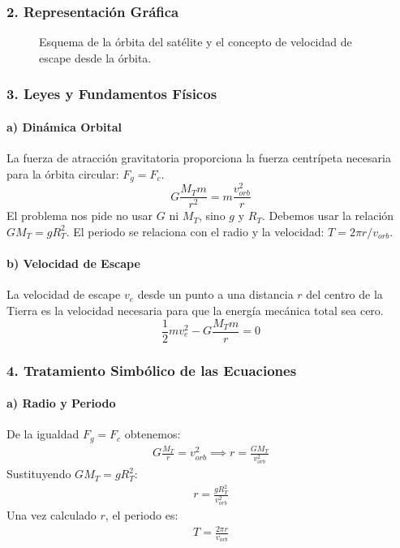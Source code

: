 \subsubsection*{2. Representación Gráfica}
\begin{figure}[H]
    \centering
    \caption{Esquema de la órbita del satélite y el concepto de velocidad de escape desde la órbita.}
\end{figure}

\subsubsection*{3. Leyes y Fundamentos Físicos}
\paragraph*{a) Dinámica Orbital}
La fuerza de atracción gravitatoria proporciona la fuerza centrípeta necesaria para la órbita circular: $F_g = F_c$.
$$ G \frac{M_T m}{r^2} = m \frac{v_{orb}^2}{r} $$
El problema nos pide no usar $G$ ni $M_T$, sino $g$ y $R_T$. Debemos usar la relación $GM_T = g R_T^2$.
El periodo se relaciona con el radio y la velocidad: $T = 2\pi r / v_{orb}$.
\paragraph*{b) Velocidad de Escape}
La velocidad de escape $v_e$ desde un punto a una distancia $r$ del centro de la Tierra es la velocidad necesaria para que la energía mecánica total sea cero.
$$ \frac{1}{2} m v_e^2 - G\frac{M_T m}{r} = 0 $$

\subsubsection*{4. Tratamiento Simbólico de las Ecuaciones}
\paragraph*{a) Radio y Periodo}
De la igualdad $F_g=F_c$ obtenemos:
\begin{gather}
    G \frac{M_T}{r} = v_{orb}^2 \implies r = \frac{GM_T}{v_{orb}^2}
\end{gather}
Sustituyendo $GM_T = g R_T^2$:
\begin{gather}
    r = \frac{g R_T^2}{v_{orb}^2}
\end{gather}
Una vez calculado $r$, el periodo es:
\begin{gather}
    T = \frac{2\pi r}{v_{orb}}
\end{gather}
